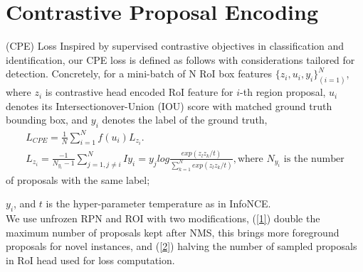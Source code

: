 \documentclass[12pt]{informs4}
\begin{document}
\tableofcontents
\newpage
\section{Contrastive Proposal Encoding}
(CPE) Loss Inspired by supervised contrastive objectives in classification and identification, our CPE loss is defined as follows with considerations tailored for detection. Concretely, for a mini-batch of N RoI box features $\{z_i,u_i,y_i\}_{(i=1)}^N$, where $z_i$ is contrastive head encoded RoI feature for $i$-th region proposal, $u_i$ denotes its Intersectionover-Union (IOU) score with matched ground truth bounding box, and $y_i$ denotes the label of the ground truth,\\
\begin{gather}
L_{CPE}=\frac{1}{N}\sum^N_{i=1}f(u_i)L_{z_i}. \label{1}\\
L_{z_i}=\frac{-1}{N_{y_i}-1}\sum^N_{j=1, j\neq{i}}I{y_i=y_j}log\frac{exp(z_l z_k/t)}{\sum\limits^N_{k=1}exp(z_l z_k/t)}, \label{2} \text{where } N_{y_i} \text{ is the number}
\end{gather}
of proposals with the same label;

$y_i$, and $t$ is the hyper-parameter temperature as in InfoNCE.\\

We use unfrozen RPN and ROI with two modifications, (\ref{1}) double the maximum number of proposals kept after NMS, this brings more foreground proposals for novel instances, and (\ref{2}) halving the number of sampled proposals in RoI head used for loss computation.
\end{document}
